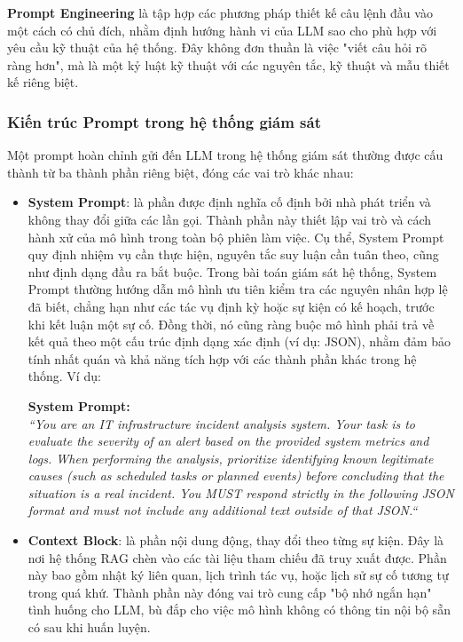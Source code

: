 \textbf{Prompt Engineering }là tập hợp các phương pháp thiết kế câu lệnh đầu vào một cách có chủ đích, nhằm định hướng hành vi của LLM sao cho phù hợp với yêu cầu kỹ thuật của hệ thống. Đây không đơn thuần là việc "viết câu hỏi rõ ràng hơn", mà là một kỷ luật kỹ thuật với các nguyên tắc, kỹ thuật và mẫu thiết kế riêng biệt.

\subsubsection*{Kiến trúc Prompt trong hệ thống giám sát}

Một prompt hoàn chỉnh gửi đến LLM trong hệ thống giám sát thường được cấu thành từ ba thành phần riêng biệt, đóng các vai trò khác nhau:
\begin{itemize}
    \item \textbf{System Prompt}: là phần được định nghĩa cố định bởi nhà phát triển và không thay đổi giữa các lần gọi. Thành phần này thiết lập vai trò và cách hành xử của mô hình trong toàn bộ phiên làm việc. Cụ thể, System Prompt quy định nhiệm vụ cần thực hiện, nguyên tắc suy luận cần tuân theo, cũng như định dạng đầu ra bắt buộc. Trong bài toán giám sát hệ thống, System Prompt thường hướng dẫn mô hình ưu tiên kiểm tra các nguyên nhân hợp lệ đã biết, chẳng hạn như các tác vụ định kỳ hoặc sự kiện có kế hoạch, trước khi kết luận một sự cố. Đồng thời, nó cũng ràng buộc mô hình phải trả về kết quả theo một cấu trúc định dạng xác định (ví dụ: JSON), nhằm đảm bảo tính nhất quán và khả năng tích hợp với các thành phần khác trong hệ thống. Ví dụ: 
    \begin{mdframed}[
  backgroundcolor=gray!10,
  linecolor=gray!60,
  linewidth=1pt,
  innerleftmargin=10pt,
  innerrightmargin=10pt
]
\small
\textbf{System Prompt:}\\[4pt]
\textit{``You are an IT infrastructure incident analysis system. Your task is to evaluate the severity of an alert based on the provided system metrics and logs. When performing the analysis, prioritize identifying known legitimate causes (such as scheduled tasks or planned events) before concluding that the situation is a real incident. You MUST respond strictly in the following JSON format and must not include any additional text outside of that JSON.``}
\end{mdframed}
\item \textbf{Context Block}: là phần nội dung động, thay đổi theo từng sự kiện. Đây là nơi hệ thống RAG chèn vào các tài liệu tham chiếu đã truy xuất được. Phần này bao gồm nhật ký liên quan, lịch trình tác vụ, hoặc lịch sử sự cố tương tự trong quá khứ. Thành phần này đóng vai trò cung cấp "bộ nhớ ngắn hạn" tình huống cho LLM, bù đắp cho việc mô hình không có thông tin nội bộ sẵn có sau khi huấn luyện.

\end{itemize}
